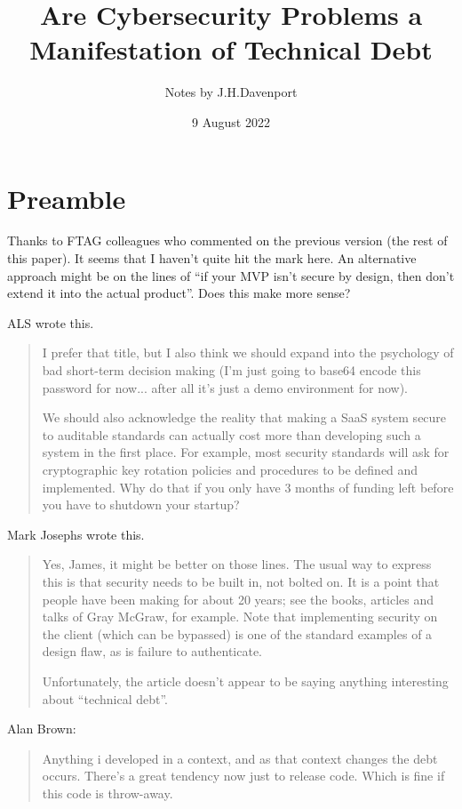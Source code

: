 \documentclass{article}
\begin{document}
\author{Notes by J.H.Davenport}
\title{Are Cybersecurity Problems a Manifestation of Technical Debt}
\date{9 August 2022}
\maketitle
\section{Preamble}
Thanks to FTAG colleagues who commented on the previous version (the rest of this paper).
It seems that I haven't quite hit the mark here.
An alternative approach might be on the lines of ``if your MVP isn't secure by design, then don't extend it into the actual product''. Does this make more sense?

ALS wrote this.
\begin{quote}
I prefer that title, but I also think we should expand into the psychology of bad short-term decision making (I'm just going to base64 encode this password for now... after all it's just a demo environment for now).  

We should also acknowledge the reality that making a SaaS system secure to auditable standards can actually cost more than developing such a system in the first place. For example, most security standards will ask for cryptographic key rotation policies and procedures to be defined and implemented.  Why do that if you only have 3 months of funding left before you have to shutdown your startup?

\end{quote}
Mark Josephs wrote this.
\begin{quote}
Yes, James, it might be better on those lines. The usual way to express this is that security needs to be built in, not bolted on. It is a point that people have been making for about 20 years; see the books, articles and talks of Gray McGraw, for example. Note that implementing security on the client (which can be bypassed) is one of the standard examples of a design flaw, as is failure to authenticate.

Unfortunately, the article doesn’t appear to be saying anything interesting about ``technical debt''.

\end{quote}
Alan Brown:
\begin{quote}
Anything i developed in a context, and as that context changes the debt occurs. There's a great tendency now just to release code. Which is fine if this code is throw-away.
\end{quote}
\begin{quote}
\end{quote}
\def\r{$\rightarrow$}
\end{document}
